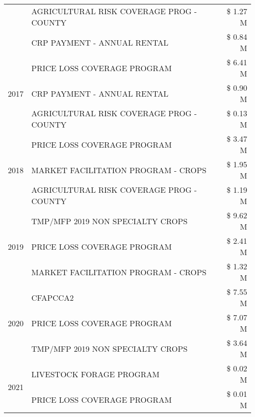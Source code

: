 \begin{tabular}{llr}
 & AGRICULTURAL RISK COVERAGE PROG - COUNTY & \$ 1.27 M \\
 & CRP PAYMENT - ANNUAL RENTAL & \$ 0.84 M \\
\cline{1-3}
\multirow[t]{3}{*}{2017} & PRICE LOSS COVERAGE PROGRAM & \$ 6.41 M \\
 & CRP PAYMENT - ANNUAL RENTAL & \$ 0.90 M \\
 & AGRICULTURAL RISK COVERAGE PROG - COUNTY & \$ 0.13 M \\
\cline{1-3}
\multirow[t]{3}{*}{2018} & PRICE LOSS COVERAGE PROGRAM & \$ 3.47 M \\
 & MARKET FACILITATION PROGRAM - CROPS & \$ 1.95 M \\
 & AGRICULTURAL RISK COVERAGE PROG - COUNTY & \$ 1.19 M \\
\cline{1-3}
\multirow[t]{3}{*}{2019} & TMP/MFP 2019 NON SPECIALTY CROPS & \$ 9.62 M \\
 & PRICE LOSS COVERAGE PROGRAM & \$ 2.41 M \\
 & MARKET FACILITATION PROGRAM - CROPS & \$ 1.32 M \\
\cline{1-3}
\multirow[t]{3}{*}{2020} & CFAPCCA2 & \$ 7.55 M \\
 & PRICE LOSS COVERAGE PROGRAM & \$ 7.07 M \\
 & TMP/MFP 2019 NON SPECIALTY CROPS & \$ 3.64 M \\
\cline{1-3}
\multirow[t]{2}{*}{2021} & LIVESTOCK FORAGE PROGRAM & \$ 0.02 M \\
 & PRICE LOSS COVERAGE PROGRAM & \$ 0.01 M \\
\cline{1-3}
\bottomrule
\end{tabular}

